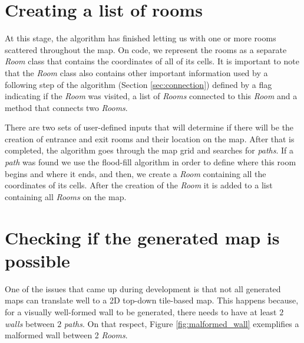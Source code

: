 \begin{figure}[h]
\begin{minipage}[b]{0.4\textwidth}
    \label{fig:20itca}
  \end{minipage}
\end{figure}

\section{Creating a list of rooms}

At this stage, the algorithm has finished letting us with one or more rooms scattered throughout the map. On code, we represent the rooms as a separate \emph{Room} class that contains the coordinates of all of its cells. It is important to note that the \emph{Room} class also contains other important information used by a following step of the algorithm (Section \ref{sec:connection}) defined by a flag indicating if the \emph{Room} was visited, a list of \emph{Rooms} connected to this \emph{Room} and a method that connects two \emph{Rooms}.

There are two sets of user-defined inputs that will determine if there will be the creation of entrance and exit rooms and their location on the map. After that is completed, the algorithm goes through the map grid and searches for \emph{paths}. If a \emph{path} was found we use the flood-fill algorithm in order to define where this room begins and where it ends, and then, we create a \emph{Room} containing all the coordinates of its cells. After the creation of the \emph{Room} it is added to a list containing all \emph{Rooms} on the map.

\section{Checking if the generated map is possible}
\label{sec:check_poss}

One of the issues that came up during development is that not all generated maps can translate well to a 2D top-down tile-based map. This happens because, for a visually well-formed wall to be generated, there needs to have at least \(2\) \emph{walls} between \(2\) \emph{paths}. On that respect, Figure \ref{fig:malformed_wall} exemplifies a malformed wall between 2 \emph{Rooms}.


